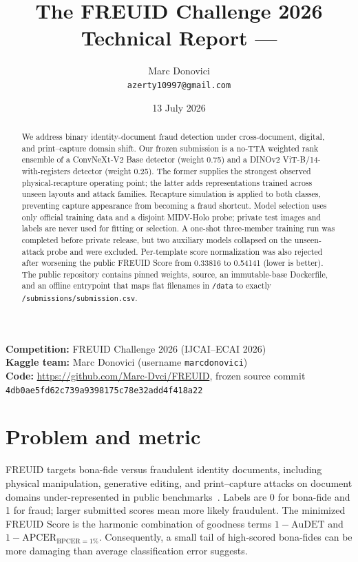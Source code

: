 \documentclass[10pt,a4paper]{article}
\title{\textbf{The FREUID Challenge 2026}\\\large Technical Report --- \teamname}
\author{Marc Donovici\\\texttt{azerty10997@gmail.com}}
\date{13 July 2026}
\newcommand{\kaggleteam}{Marc Donovici (username \texttt{marcdonovici})}
\newcommand{\freezesha}{4db0ae5fd62c739a9398175c78e32add4f418a22}
\begin{document}
\maketitle

\begin{abstract}
We address binary identity-document fraud detection under cross-document, digital, and
print--capture domain shift. Our frozen submission is a no-TTA weighted rank ensemble of a
ConvNeXt-V2 Base detector (weight 0.75) and a DINOv2 ViT-B/14-with-registers detector (weight
0.25). The former supplies the strongest observed physical-recapture operating point; the latter
adds representations trained across unseen layouts and attack families. Recapture simulation is
applied to both classes, preventing capture appearance from becoming a fraud shortcut. Model
selection uses only official training data and a disjoint MIDV-Holo probe; private test images and
labels are never used for fitting or selection. A one-shot three-member training run was completed
before private release, but two auxiliary models collapsed on the unseen-attack probe and were
excluded. Per-template score normalization was also rejected after worsening the public FREUID
Score from 0.33816 to 0.54141 (lower is better). The public repository contains pinned weights,
source, an immutable-base Dockerfile, and an offline entrypoint that maps flat filenames in
\texttt{/data} to exactly \texttt{/submissions/submission.csv}.
\end{abstract}

\noindent\textbf{Competition:} FREUID Challenge 2026 (IJCAI--ECAI 2026)\\
\textbf{Kaggle team:} \kaggleteam\\
\textbf{Code:} \url{https://github.com/Marc-Dvci/FREUID}, frozen source commit
\texttt{\freezesha}

\section{Problem and metric}
FREUID targets bona-fide versus fraudulent identity documents, including physical manipulation,
generative editing, and print--capture attacks on document domains under-represented in public
benchmarks~\cite{freuid2026}. Labels are 0 for bona-fide and 1 for fraud; larger submitted scores
mean more likely fraudulent. The minimized FREUID Score is the harmonic combination of goodness
terms $1-\mathrm{AuDET}$ and $1-\mathrm{APCER}_{\mathrm{BPCER}=1\%}$. Consequently, a small tail of
high-scored bona-fides can be more damaging than average classification error suggests.
\end{document}
